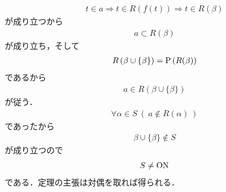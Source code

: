 \begin{prf}
		\begin{align}
			t \in a \Longrightarrow t \in R(f(t)) \Longrightarrow t \in R(\beta)
		\end{align}
		が成り立つから
		\begin{align}
			a \subset R(\beta)
		\end{align}
		が成り立ち，そして
		\begin{align}
			R\left(\beta \cup \{\beta\}\right) = \operatorname*{P} \left(R(\beta)\right)
		\end{align}
		であるから
		\begin{align}
			a \in R\left(\beta \cup \{\beta\}\right)
		\end{align}
		が従う．
		\begin{align}
			\forall \alpha \in S\ (\ a \notin R(\alpha)\ )
		\end{align}
		であったから
		\begin{align}
			\beta \cup \{\beta\} \notin S
		\end{align}
		が成り立つので
		\begin{align}
			S \neq \mathrm{ON}
		\end{align}
		である．定理の主張は対偶を取れば得られる．
		\QED
	\end{prf}
	
	\begin{screen}
		\begin{dfn}[集合の階数]
		\end{dfn}
	\end{screen}